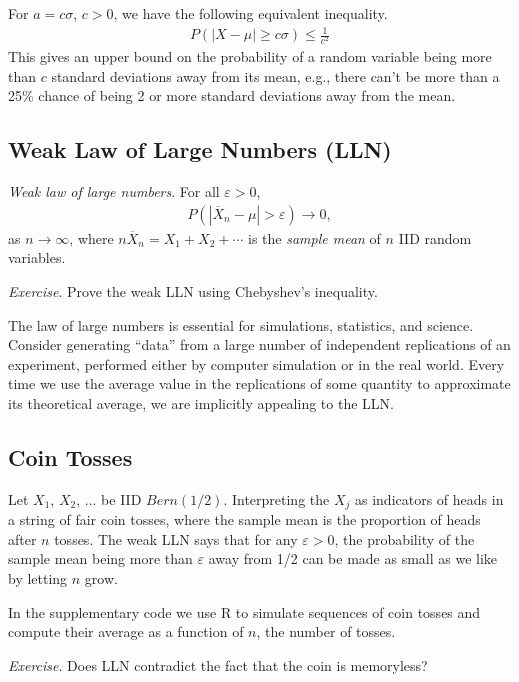 \documentclass[11pt,a4paper]{article}
\begin{document}
For \(a = c\sigma\), \(c > 0\), 
we have the following equivalent inequality.
\begin{align}
P\left( |X - \mu| \geq c\sigma \right) \leq \frac{1}{c^{2}}
\end{align}
This gives an upper bound on the probability of a random variable being
more than \(c\) standard deviations away from its mean, 
e.g., there can't be more than a 25\% chance of being 2 or more standard deviations
away from the mean.

\subsection{Weak Law of Large Numbers (LLN)}

\emph{Weak law of large numbers}. 
For all \(\varepsilon > 0\),
\begin{align}
P\left( \left| {\overline{X}}_{n} - \mu \right| > \varepsilon \right) \rightarrow 0,
\end{align}
as \(n \rightarrow \infty\), where
\({n\overline{X}}_{n} = X_{1} + X_{2} + \cdots\) is the \emph{sample
mean} of \(n\) IID random variables. 

\emph{Exercise}. 
Prove the weak LLN using Chebyshev's inequality.

The law of large numbers is essential for simulations, 
statistics, and science. 
Consider generating ``data'' from a large number of independent 
replications of an experiment, 
performed either by computer simulation
or in the real world. 
Every time we use the average value in the
replications of some quantity to approximate its theoretical average, 
we are implicitly appealing to the LLN.

\subsection{Coin Tosses}

Let \(X_{1}\), \(X_{2}\), ... be IID \(Bern(1/2)\). 
Interpreting the \(X_{j}\) as indicators of heads in a string of fair coin tosses,
where the sample mean is the proportion of heads after \(n\) tosses. 
The weak LLN says that for any \(\varepsilon > 0\), 
the probability of the
sample mean being more than \(\varepsilon\) away from 1/2 can be made as
small as we like by letting \(n\) grow.

In the supplementary code we use R to simulate sequences of coin tosses and compute 
their average as
a function of \(n\), the number of tosses.

\emph{Exercise}. Does LLN contradict the fact that the coin is memoryless?
\end{document}
